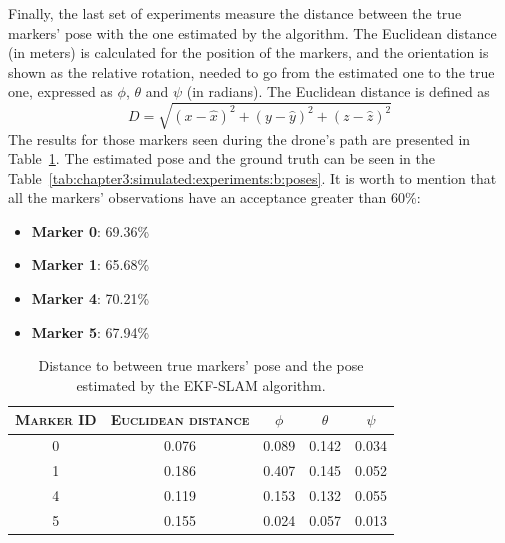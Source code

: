 Finally, the last set of experiments measure the distance between the true markers' pose with the one estimated by the algorithm. The Euclidean distance (in meters) is calculated for the position of the markers, and the orientation is shown as the relative rotation, needed to go from the estimated one to the true one, expressed as $\phi$, $\theta$ and $\psi$ (in radians). The Euclidean distance is defined as\\
\begin{equation*}
    D = \sqrt{(x - \hat{x})^2 + (y - \hat{y})^2 + (z - \hat{z})^2}
\end{equation*}
The results for those markers seen during the drone's path are presented in Table~\ref{tab:chapter3:simulated:experiments:b:distance}. The estimated pose and the ground truth can be seen in the Table~\ref{tab:chapter3:simulated:experiments:b:poses}. It is worth to mention that all the markers' observations have an acceptance greater than 60\%:
\begin{itemize}
    \item{\textbf{Marker 0}: 69.36\%}
    \item{\textbf{Marker 1}: 65.68\%}
    \item{\textbf{Marker 4}: 70.21\%}
    \item{\textbf{Marker 5}: 67.94\%}
\end{itemize}

\begin{table}
    \centering
    \begin{tabular}{ccccc}
        \toprule
        \textsc{Marker ID} & \textsc{Euclidean distance} & \textsc{$\phi$} & \textsc{$\theta$} & \textsc{$\psi$} \\
        \midrule
        0 & 0.076 & 0.089 & 0.142 & 0.034\\
        1 & 0.186 & 0.407 & 0.145 & 0.052\\
        4 & 0.119 & 0.153 & 0.132 & 0.055\\
        5 & 0.155 & 0.024 & 0.057 & 0.013\\
        \bottomrule
    \end{tabular}
    \caption[Distance to true markers' pose]{Distance to between true markers' pose and the pose estimated by the EKF-SLAM algorithm.}
    \label{tab:chapter3:simulated:experiments:b:distance}
\end{table}


